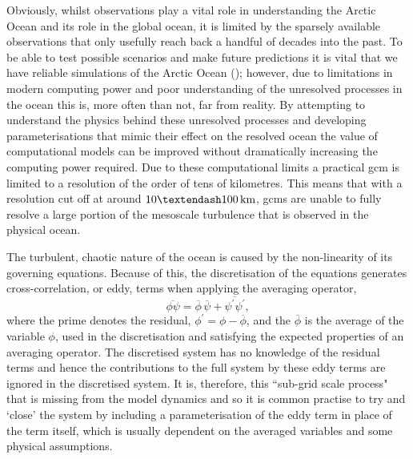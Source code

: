 \documentclass[10pt,a4paper]{article}
\newcommand*\mean[1]{\overline{#1}}
\newcommand*\res[1]{{#1}^{\prime}}
\begin{document}
 Obviously, whilst observations play a vital role in understanding the Arctic
 Ocean and its role in the global ocean, it is limited by the sparsely available
 observations that only usefully reach back a handful of decades into the past.
 To be able to test possible scenarios and make future predictions it is vital
 that we have reliable simulations of the Arctic Ocean (\cite{proshutinsky2008toward});
 however, due to limitations
 in modern computing power and poor understanding of the unresolved processes 
 in the ocean this is, more often than not, far from reality.
 By attempting  to understand the physics behind these unresolved processes 
 and developing parameterisations that mimic their effect on the resolved ocean
 the value of computational models can be improved without dramatically increasing the
 computing power required.  Due to these computational limits a practical \gls{gcm} is 
 limited to a  resolution of the order of tens of kilometres. This means that with a 
 resolution  cut off at around $10 \textendash 100 \, \rm km$, 
 \glspl{gcm} are unable to fully resolve a large portion of the mesoscale turbulence that is
 observed in the physical ocean.
 
 The turbulent, chaotic nature of the ocean is caused by the non-linearity of its 
 governing equations. Because of this,  the discretisation of the equations generates cross-correlation, or eddy, terms when applying the 
 averaging operator,
 \begin{equation}
 \mean{\phi\psi} = \mean{\phi}\,\mean{\psi} + 
 \mean{\res{\psi}\res{\psi}},
 \label{non-lin average}
 \end{equation}
 where the prime denotes the residual, ${\phi^{\prime} = \phi - \mean{\phi}}$,
 and the ${\mean{\phi}}$ is the average of the variable ${\phi}$, used in
 the discretisation and satisfying
 the expected properties of an averaging operator.
 The discretised system has no knowledge of the residual terms and hence
 the contributions to the full system by these eddy terms are
 ignored in the discretised system. It is, therefore, this ``sub-grid scale process"
 that is missing from the model dynamics and so it is common practise to try and
 `close' the system by including a parameterisation of the eddy
 term in place of the term itself, which is usually dependent on the averaged 
 variables and some physical assumptions.
 
\end{document}

